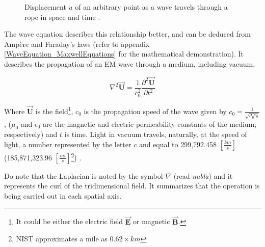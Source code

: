 \begin{figure}[htbp]
    \centering
    \caption{Displacement $u$ of an arbitrary point as a wave travels through a rope in space and time \protect\cite{u_parameter_explanation-figure}.}
    \label{fig:u_parameter_explanation}
\end{figure}

\newpage
The wave equation describes this relationship better, and can be deduced from Ampère and Faraday's laws (refer to appendix \ref{WaveEquation_MaxwellEquations} for the mathematical demonstration). It describes the propagation of an EM wave through a medium, including vacuum.

\begin{equation}
    \nabla^2 \overrightarrow{\textbf{U}} = \frac{1}{c_0^2}\frac{\partial^2 \overrightarrow{\textbf{U}}}{\partial t^2}
    \label{Wave_Equation}
\end{equation}

Where $\overrightarrow{\textbf{U}}$ is the field\footnote{It could be either the electric field $\overrightarrow{\textbf{E}}$ or magnetic $\overrightarrow{\textbf{B}}$.}, $c_0$ is the propagation speed of the wave given by $c_0 = \frac{1}{\sqrt{\mu_0 \epsilon_0}}$, ($\mu_0$ and $\epsilon_0$ are the magnetic and electric permeability constants of the medium, respectively) and $t$ is time. Light in vacuum travels, naturally, at the speed of light, a number represented by the letter $c$ and equal to 299,792.458 $[\frac{km}{s}]$ (185,871,323.96 $[\frac{mi}{s}]$\footnote{NIST approximates a mile as $0.62 \times km$}) \cite{Hecht_Optics-Chapter3_EM_Waves} \cite{Speed_of_Light:NIST}.

Do note that the Laplacian is noted by the symbol $\nabla$ (read \textit{nabla}) and it represents the curl of the tridimensional field. It summarizes that the operation is being carried out in each spatial axis.

